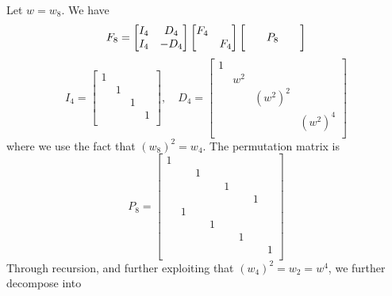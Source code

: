 \documentclass[a4paper]{article}
\begin{document}
Let \( w = w_{8} \). We have
\[
	F_{8} = \begin{bmatrix}
		I_{4} & D_{4} \\
		I_{4} & -D_{4} \\
	\end{bmatrix}
	\begin{bmatrix}
		F_{4} & \\
		 & F_{4} \\
	\end{bmatrix}
	\left[
		\hphantom{\begin{bmatrix} F_{4} \end{bmatrix}} \\
		\vphantom{\begin{bmatrix} F_{4} & \\ & F_{4} \end{bmatrix}} \\
		P_{8}
		\hphantom{\begin{bmatrix} F_{4} \end{bmatrix}} \\
	\right]
\]
\[
	I_{4} = \begin{bmatrix}
		1 &  &  & \\
		 & 1 &  & \\
		 &  & 1 & \\
		 &  &  & 1 \\
	\end{bmatrix}, \quad
	D_{4} = \begin{bmatrix}
		1 &  &  & \\
		 & w^{2} &  & \\
		 &  & \!\left( w^{2} \right)^{2} & \\
		 &  &  & \!\left( w^{2} \right)^{4} \\
	\end{bmatrix}
\]
where we use the fact that \( \!\left( w_{8} \right)^{2} = w_{4} \). The permutation matrix is
\[
	P_{8} = \begin{bmatrix}
		1 &  &  &  &  &  &  & \\
		 &  & 1 &  &  &  &  & \\
		 &  &  &  & 1 &  &  & \\
		 &  &  &  &  &  & 1 & \\
		 & 1 &  &  &  &  &  & \\
		 &  &  & 1 &  &  &  & \\
		 &  &  &  &  & 1 &  & \\
		 &  &  &  &  &  &  & 1 \\
	\end{bmatrix} 
\]
Through recursion, and further exploiting that \( \!\left( w_{4} \right)^{2} = w_{2} = w^{4} \), we further decompose into
\end{document}
